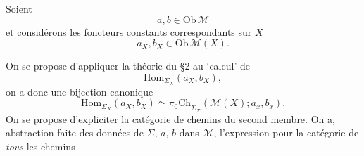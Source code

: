 \documentclass[11pt]{article}
\newcommand{\msp}[1]{\marginpar{\footnotesize [#1]}}
\newcommand{\uCh}{\underline{\mathrm{Ch}}}
\newcommand{\Hom}{\mathrm{Hom}}
\begin{document}
Soient
\[
a, b \in \mathrm{Ob}\,\mathcal{M}
\]
et considérons les foncteurs constants correspondants sur $X$
\[
a_X, b_X \in \mathrm{Ob}\,\mathcal{M}(X).
\]

\msp{page 29}On se propose d'appliquer la théorie du \S2 au `calcul' de
\[
\Hom_{\Sigma_X}(a_X, b_X),
\]
on a donc une bijection canonique
\[
\boxed{\Hom_{\Sigma_X}(a_X, b_X) \simeq \pi_0\uCh_{\Sigma_X}(\mathcal{M}(X); a_x, b_x).} %
\]
On se propose d'expliciter la catégorie de chemins du second membre. On a, abstraction faite des données de $\Sigma$, $a$, $b$ dans $\mathcal{M}$, l'expression pour la catégorie de \textit{tous} les chemins
\end{document}
